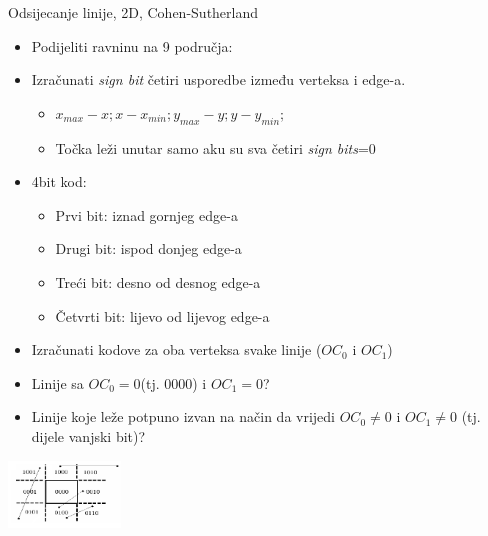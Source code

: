 \documentclass[9pt]{beamer}
\begin{document}
\begin{frame}{Odsijecanje linije, 2D, Cohen-Sutherland}
	\begin{itemize}
		\item Podijeliti ravninu na 9 područja:
		\item Izračunati \textsl{sign bit} četiri usporedbe između verteksa i edge-a.
		\begin{itemize}
			\item $x_{max}- x;  x-x_{min}; y_{max}-y;  y-y_{min};$
			\item Točka leži unutar samo aku su sva četiri \textsl{sign bits}=0
		\end{itemize}
		\item 4bit kod:
		\begin{itemize}
			\item Prvi bit: iznad gornjeg edge-a
			\item Drugi bit: ispod donjeg edge-a
			\item Treći bit: desno od desnog edge-a
			\item Četvrti bit: lijevo od lijevog edge-a
		\end{itemize}
		\item Izračunati kodove za oba verteksa svake linije ($OC_{0}$ i $OC_{1}$)
		\item Linije sa $OC_{0} = 0$(tj. $0000$) i $OC_{1}=0$?
		\item Linije koje leže potpuno izvan na način da vrijedi $OC_{0}\neq0$ i $OC_{1}\neq0$ (tj. dijele vanjski bit)?
	\end{itemize}
	\begin{center}
		\includegraphics[width=3cm]{slike/clip_rect.png}
	\end{center}
\end{frame}
\end{document}
